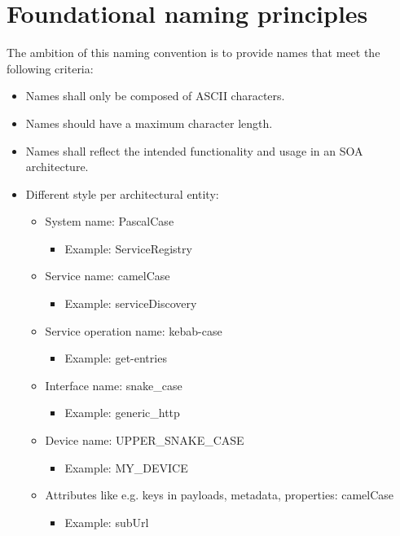 \documentclass[a4paper]{arrowhead}
\begin{document}
\section{Foundational naming principles}
\label{sec:principles}
The ambition of this naming convention is to provide names that meet the following criteria:
\begin{itemize}

\item Names shall only be composed of ASCII characters.

\item Names should have a maximum character length.

\item Names shall reflect the intended functionality and usage in an
  SOA architecture.
  
\item Different style per architectural entity:
  \begin{itemize}
  \item System name: PascalCase
    \begin{itemize}
    \item Example: ServiceRegistry
    \end{itemize}

  \item Service name: camelCase
  \begin{itemize}
    \item Example: serviceDiscovery
    \end{itemize}

  \item Service operation name: kebab-case
  \begin{itemize}
    \item Example: get-entries
    \end{itemize}

  \item Interface name: snake\_case
    \begin{itemize}
    \item Example: generic\_http
    \end{itemize}

  \item Device name: UPPER\_SNAKE\_CASE
  \begin{itemize}
    \item Example: MY\_DEVICE
    \end{itemize}
    
  \item Attributes like e.g. keys in payloads, metadata, properties: camelCase
   \begin{itemize}
    \item Example: subUrl
    \end{itemize}
 \end{itemize}


\end{itemize}
\end{document}
